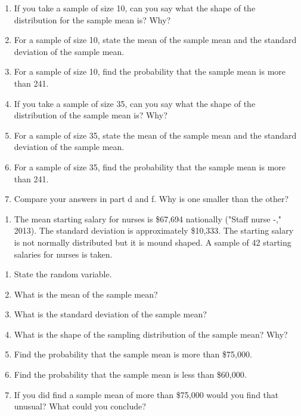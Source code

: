 \documentclass[]{book}
\providecommand{\tightlist}{%
  \setlength{\itemsep}{0pt}\setlength{\parskip}{0pt}}
\begin{document}
\begin{enumerate}
\def\labelenumi{\alph{enumi}.}
\tightlist
\item
  If you take a sample of size 10, can you say what the shape of the distribution for the sample mean is? Why?
\item
  For a sample of size 10, state the mean of the sample mean and the standard deviation of the sample mean.
\item
  For a sample of size 10, find the probability that the sample mean is more than 241.
\item
  If you take a sample of size 35, can you say what the shape of the distribution of the sample mean is? Why?
\item
  For a sample of size 35, state the mean of the sample mean and the standard deviation of the sample mean.
\item
  For a sample of size 35, find the probability that the sample mean is more than 241.
\item
  Compare your answers in part d and f. Why is one smaller than the other?
\end{enumerate}

\begin{enumerate}
\def\labelenumi{\arabic{enumi}.}
\setcounter{enumi}{2}
\tightlist
\item
  The mean starting salary for nurses is \$67,694 nationally ("Staff nurse -," 2013). The standard deviation is approximately \$10,333. The starting salary is not normally distributed but it is mound shaped. A sample of 42 starting salaries for nurses is taken.
\end{enumerate}

\begin{enumerate}
\def\labelenumi{\alph{enumi}.}
\tightlist
\item
  State the random variable.
\item
  What is the mean of the sample mean?
\item
  What is the standard deviation of the sample mean?
\item
  What is the shape of the sampling distribution of the sample mean? Why?
\item
  Find the probability that the sample mean is more than \$75,000.
\item
  Find the probability that the sample mean is less than \$60,000.
\item
  If you did find a sample mean of more than \$75,000 would you find that unusual? What could you conclude?
\end{enumerate}
\end{document}
